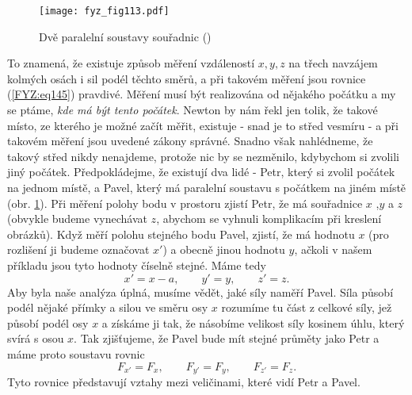 {    \begin{figure}[ht!]  %
      \centering
      \texttt{[image: fyz\_fig113.pdf]}
      \caption{Dvě paralelní soustavy souřadnic
              (\cite[s.~154]{Feynman01})}
      \label{fyz:fig113}
    \end{figure}
    To znamená, že existuje způsob měření vzdáleností \(x, y, z\) na třech navzájem kolmých osách i 
    sil podél těchto směrů, a při takovém měření jsou rovnice (\ref{FYZ:eq145}) pravdivé. Měření 
    musí být realizována od nějakého počátku a my se ptáme, \emph{kde má být tento počátek}. Newton 
    by nám řekl jen tolik, že takové místo, ze kterého je možné začít měřit, existuje - snad je to 
    střed vesmíru - a při takovém měření jsou uvedené zákony správné. Snadno však nahlédneme, že 
    takový střed nikdy nenajdeme, protože nic by se nezměnilo, kdybychom si zvolili jiný počátek. 
    Předpokládejme, že existují dva lidé - Petr, který si zvolil počátek na jednom místě, a Pavel, 
    který má paralelní soustavu s počátkem na jiném místě (obr. \ref{fyz:fig113}). Při měření 
    polohy bodu v prostoru zjistí Petr, že má souřadnice \(x\) ,\(y\) a \(z\) (obvykle budeme 
    vynechávat \(z\), abychom se vyhnuli komplikacím při kreslení obrázků). Když měří polohu 
    stejného bodu Pavel, zjistí, že má hodnotu \(x\) (pro rozlišení ji budeme označovat \(x'\)) a 
    obecně jinou hodnotu \(y\), ačkoli v našem příkladu jsou tyto hodnoty číselně stejné. Máme tedy
    \begin{equation}\label{FYZ:eq146}
      x' = x - a, \qquad y' = y, \qquad z' = z.
    \end{equation}
    Aby byla naše analýza úplná, musíme vědět, jaké síly naměří Pavel. Síla působí podél nějaké 
    přímky a silou ve směru osy \(x\) rozumíme tu část z celkové síly, jež působí podél osy \(x\) a 
    získáme ji tak, že násobíme velikost síly kosinem úhlu, který svírá s osou \(x\). Tak 
    zjišťujeme, že Pavel bude mít stejné průměty jako Petr a máme proto soustavu rovnic
    \begin{equation}\label{FYZ:eq147}
      F_{x'} = F_x, \qquad F_{y'} = F_y, \qquad F_{z'} = F_z.
    \end{equation}
    Tyto rovnice představují vztahy mezi veličinami, které vidí Petr a Pavel.
    
}
